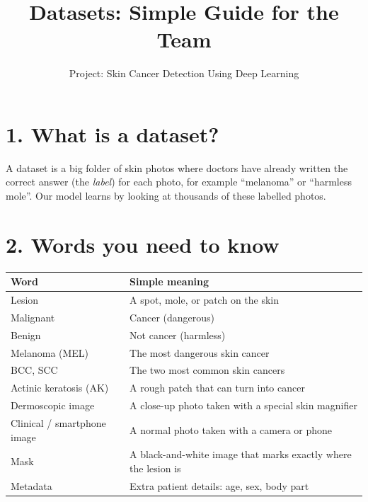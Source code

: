\documentclass[11pt,a4paper]{article}
\title{\color{hcBlue}\bfseries Datasets: Simple Guide for the Team}
\author{Project: Skin Cancer Detection Using Deep Learning}
\date{}
\begin{document}
\maketitle
\vspace{-8mm}

\section*{1. What is a dataset?}
A dataset is a big folder of skin photos where doctors have already
written the correct answer (the \emph{label}) for each photo, for
example ``melanoma'' or ``harmless mole''. Our model learns by looking
at thousands of these labelled photos.

\section*{2. Words you need to know}
\begin{tabularx}{\linewidth}{@{}L{3.6cm} Y@{}}
\toprule
\textbf{Word} & \textbf{Simple meaning} \\
\midrule
Lesion & A spot, mole, or patch on the skin \\
Malignant & Cancer (dangerous) \\
Benign & Not cancer (harmless) \\
Melanoma (MEL) & The most dangerous skin cancer \\
BCC, SCC & The two most common skin cancers \\
Actinic keratosis (AK) & A rough patch that can turn into cancer \\
Dermoscopic image & A close-up photo taken with a special skin magnifier \\
Clinical / smartphone image & A normal photo taken with a camera or phone \\
Mask & A black-and-white image that marks exactly where the lesion is \\
Metadata & Extra patient details: age, sex, body part \\
\bottomrule
\end{tabularx}
\end{document}
